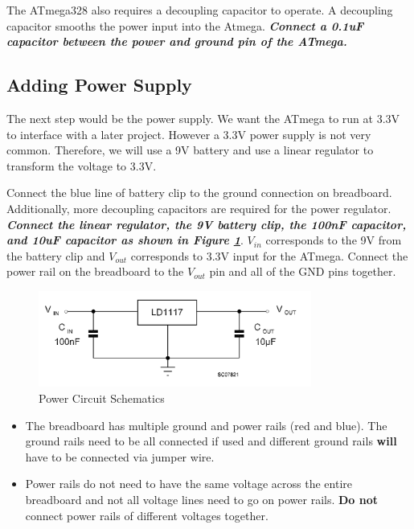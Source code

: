 \documentclass{article}
\begin{document}
The ATmega328 also requires a decoupling capacitor to operate. A decoupling capacitor smooths the power input into the Atmega. \textbf{\emph{Connect a 0.1uF capacitor between the power and ground pin of the ATmega.}}

\subsection{Adding Power Supply}
The next step would be the power supply. We want the ATmega to run at 3.3V to interface with a later project. However a 3.3V power supply is not very common. Therefore, we will use a 9V battery and use a linear regulator to transform the voltage to 3.3V. \par
Connect the blue line of battery clip to the ground connection on breadboard. Additionally, more decoupling capacitors are required for the power regulator. \emph{\textbf{Connect the linear regulator, the 9V battery clip, the 100nF capacitor, and 10uF capacitor as shown in Figure \ref{img:linear_regulator}}}. $V_{in}$ corresponds to the 9V from the battery clip and $V_{out}$ corresponds to 3.3V input for the ATmega. Connect the power rail on the breadboard to the $V_{out}$ pin and all of the GND pins together. 

\begin{figure}[!h]
    \center
    \includegraphics[width=0.8\textwidth,keepaspectratio]{linear_regulator}
    \caption{Power Circuit Schematics}
    \label{img:linear_regulator}
\end{figure}

\begin{tcolorbox} [title=Tips \& Tricks]
    \begin{itemize}
        \item The breadboard has multiple ground and power rails (red and blue). The ground rails need to be all connected if used and different ground rails \textbf{will} have to be connected via jumper wire.
        \item Power rails do not need to have the same voltage across the entire breadboard and not all voltage lines need to go on power rails. \textbf{Do not} connect power rails of different voltages together.
    \end{itemize}
\end{tcolorbox}
\end{document}
